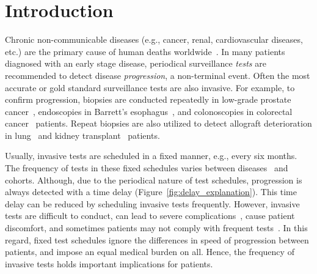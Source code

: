 \section{Introduction}
\label{sec:introduction}
Chronic non-communicable diseases (e.g., cancer, renal, cardiovascular diseases, etc.) are the primary cause of human deaths worldwide~\citep{alwan2010monitoring}. In many patients diagnosed with an early stage disease, periodical surveillance \textit{tests} are recommended to detect disease \textit{progression}, a non-terminal event. Often the most accurate or gold standard surveillance tests are also invasive. For example, to confirm progression, biopsies are conducted repeatedly in low-grade prostate cancer~\citep{bokhorst2015compliance}, endoscopies in Barrett's esophagus~\citep{streitz1993endoscopic}, and colonoscopies in colorectal cancer~\citep{krist2007timing} patients. Repeat biopsies are also utilized to detect allograft deterioration in lung~\citep{mcwilliams2008surveillance} and kidney transplant~\citep{henderson2011surveillance} patients.

Usually, invasive tests are scheduled in a fixed manner, e.g., every six months. The frequency of tests in these fixed schedules varies between diseases~\citep{henderson2011surveillance,bokhorst2015compliance,krist2007timing} and cohorts. Although, due to the periodical nature of test schedules, progression is always detected with a time delay (Figure~\ref{fig:delay_explanation}). This time delay can be reduced by scheduling invasive tests frequently. However, invasive tests are difficult to conduct, can lead to severe complications~\citep{loeb2013systematic,krist2007timing}, cause patient discomfort, and sometimes patients may not comply with frequent tests~\citep{bokhorst2015compliance}. In this regard, fixed test schedules ignore the differences in speed of progression between patients, and impose an equal medical burden on all. Hence, the frequency of invasive tests holds important implications for patients.

